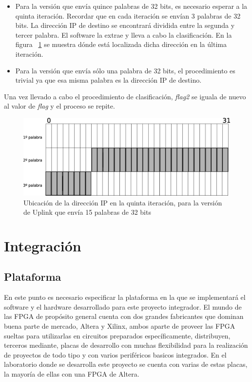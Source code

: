 \begin{itemize}
	\item Para la versión que envía quince palabras de 32 bits, es necesario esperar a la quinta iteración. Recordar que en cada iteración se envían 3 palabras de 32 bits. La dirección IP de destino se encontrará dividida entre la segunda y tercer palabra. El software la extrae y lleva a cabo la clasificación. En la figura ~\ref{fig:ip15pal} se muestra dónde está localizada dicha dirección en la última iteración.
	\item Para la versión que envía sólo una palabra de 32 bits, el procedimiento es trivial ya que esa misma palabra es la dirección IP de destino.
\end{itemize}


Una vez llevado a cabo el procedimiento de clasificación, \textit{flag2} se iguala de nuevo al valor de \textit{flag }y el proceso se repite.


\begin{figure}[H]
  \centering
	\includegraphics[scale=0.30]{4-implementacion/graf/ip15pal.eps}
  \caption{Ubicación de la dirección IP en la quinta iteración, para la versión de Uplink que envía 15 palabras de 32 bits}
  \label{fig:ip15pal}
\end{figure}

\chapter{Integración}

\section{Plataforma}

En este punto es necesario especificar la plataforma en la que se implementará el software y el hardware desarrollado para este proyecto integrador. El mundo de las FPGA de propósito general cuenta con dos grandes fabricantes que dominan buena parte de mercado, Altera y Xilinx, ambos aparte de proveer las FPGA sueltas para utilizarlas en circuitos preparados específicamente, distribuyen, terceros mediante, placas de desarrollo con muchas flexibilidad para la realización de proyectos de todo tipo y con varios periféricos basicos integrados. En el laboratorio donde se desarrolla este proyecto se cuenta con varias de estas placas, la mayoría de ellas con una FPGA de Altera. 

